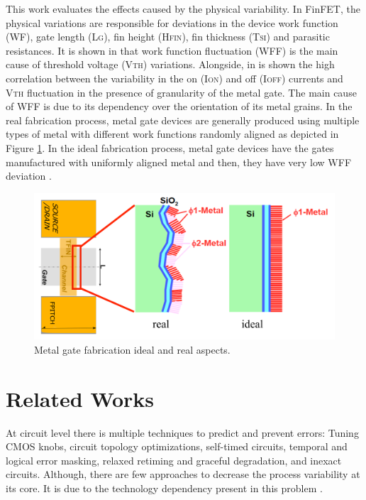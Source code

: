 \documentclass[ecp,tc, english]{iiufrgs}
\begin{document}
This work evaluates the effects caused by the physical variability. In FinFET, the physical variations are responsible for deviations in the device work function (WF), gate length (L\textsc{g}), fin height (H\textsc{fin}), fin thickness (T\textsc{si}) and parasitic resistances. It is shown in \cite{meinhardt2014impact} that work function fluctuation (WFF) is the main cause of threshold voltage (V\textsc{th}) variations. Alongside, in \cite{wang2011statistical} is shown the high correlation between the variability in the on (I\textsc{on}) and off (I\textsc{off}) currents and V\textsc{th} fluctuation in the presence of granularity of the metal gate. The main cause of WFF is due to its dependency over the orientation of its metal grains. In the real fabrication process, metal gate devices are generally produced using multiple types of metal with different work functions randomly aligned as depicted in Figure \ref{wff}. In the ideal fabrication process, metal gate devices have the gates manufactured with uniformly aligned metal and then, they have very low WFF deviation \cite{wffSource}.

\begin{figure}[H]
\centering
\includegraphics[width=\textwidth]{wff.png}
\caption{Metal gate fabrication ideal and real aspects.}
\label{wff}
\end{figure}

\section{Related Works}

At circuit level there is multiple techniques to predict and prevent errors: Tuning CMOS knobs, circuit topology optimizations, self-timed circuits, temporal and logical error masking, relaxed retiming and graceful degradation, and inexact circuits. Although, there are few approaches to decrease the process variability at its core. It is due to the technology dependency present in this problem \cite{rahimi2016variability}.
\end{document}
